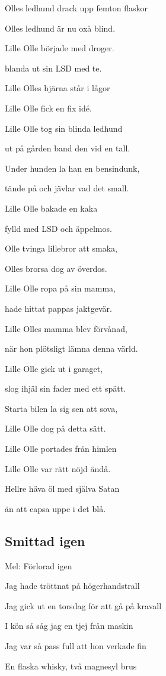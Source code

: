 Olles ledhund drack upp femton flaskor

Olles ledhund är nu oxå blind.\bigskip


Lille Olle började med droger.

blanda ut sin LSD med te.

Lille Olles hjärna står i lågor

Lille Olle fick en fix idé.\bigskip


Lille Olle tog sin blinda ledhund

ut på gården band den vid en tall.

Under hunden la han en bensindunk,

tände på och jävlar vad det small.\bigskip


Lille Olle bakade en kaka

fylld med LSD och äppelmos.

Olle tvinga lillebror att smaka,

Olles brorsa dog av överdos.\bigskip


Lille Olle ropa på sin mamma,

hade hittat pappas jaktgevär.

Lille Olles mamma blev förvånad,

när hon plötsligt lämna denna värld.\bigskip


Lille Olle gick ut i garaget,

slog ihjäl sin fader med ett spätt.

Starta bilen la sig sen att sova,

Lille Olle dog på detta sätt.\bigskip


Lille Olle portades från himlen

Lille Olle var rätt nöjd ändå.

Hellre häva öl med själva Satan

än att capsa uppe i det blå.

\subsection{\textbf{Smittad igen}}

Mel: Förlorad igen\bigskip


Jag hade tröttnat på högerhandstrall

Jag gick ut en torsdag för att gå på kravall

I kön så såg jag en tjej från maskin

Jag var så pass full att hon verkade fin\bigskip


En flaska whisky, två magnesyl brus

